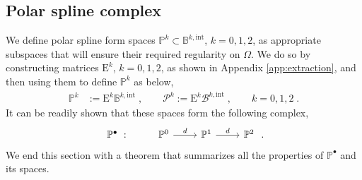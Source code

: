 \documentclass[10pt]{article}
\newcommand{\mbf}[1]{{\boldsymbol{#1}}}
\newcommand{\basis}[1]{\mathcal{#1}}
\newcommand{\vSpace}[1]{\mathbb{#1}}
\newcommand{\complex}[1]{\mathit{\vSpace{#1}^\bullet}}
\newcommand{\mat}[1]{\mbf{\mathrm{#1}}}
\newcommand{\bsp}{B}
\newcommand{\bspB}{\basis{\bsp}}
\newcommand{\bspS}{\vSpace{\bsp}}
\newcommand{\polar}{P}
\newcommand{\polarB}{\basis{\polar}}
\newcommand{\polarS}{\vSpace{\polar}}
\newcommand{\polarF}[1]{\polarS^{#1}}
\newcommand{\tint}{\mathrm{int}}
\newcommand{\polarDomain}{\Omega}
\theoremstyle{plain}
\theoremstyle{definition}
\theoremstyle{remark}
\begin{document}
\subsection{Polar spline complex}
We define polar spline form spaces $\polarS^k \subset \bspS^{k,\tint}$, $k = 0, 1, 2$, as appropriate subspaces that will ensure their required regularity on $\polarDomain$.
We do so by constructing matrices $\mat{E}^{k}$, $k = 0, 1, 2$, as shown in Appendix \ref{app:extraction}, and then using them to define $\polarF{k}$ as below,
\begin{equation}
    \begin{split}
        \polarF{k} &:= \mat{E}^{k}\bspS^{k,\tint}\;,\qquad
        \polarB^k := \mat{E}^{k}\bspB^{k,\tint}\;,\qquad
        k = 0, 1, 2\;.
    \end{split}
\end{equation}
It can be readily shown that these spaces form the following complex,
\begin{equation}
    \begin{tikzcd}
        {\complex{\polar}}~: & \polarF{0} \arrow{r}{d} & \polarF{1} \arrow{r}{d} & \polarF{2}
    \end{tikzcd}\;.
\end{equation}
We end this section with a theorem that summarizes all the properties of $\complex{\polar}$ and its spaces.
\end{document}
